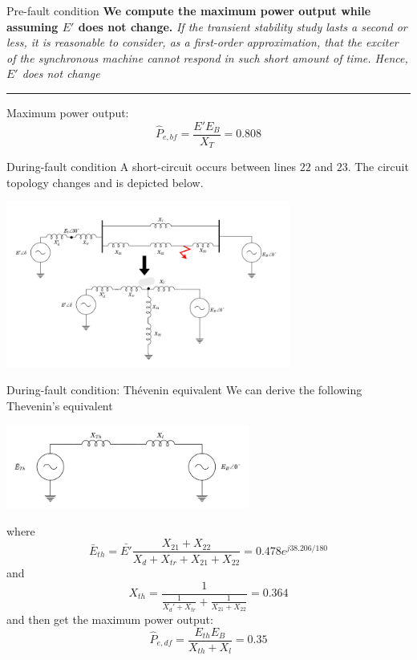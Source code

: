 \begin{frame}{Pre-fault condition}
\textbf{We compute the maximum power output while assuming $E'$ does not change.}
\emph{If the transient stability study lasts a second or less, it is reasonable to consider, as a first-order approximation, that the exciter of the synchronous machine cannot respond in such short amount of time. Hence, $E'$ does not change}
\vspace{0.5cm}
\hrule
\vspace{0.5cm}
Maximum power output:
$$\hat{P}_{e,bf} = \frac{E'E_{B}}{X_{T}} = 0.808$$
\end{frame}

\begin{frame}[allowframebreaks]{During-fault condition}
A short-circuit occurs between lines $22$ and $23$. The circuit topology changes and is depicted below.
\begin{center}
\includegraphics[width=0.7\textwidth]{images/DuringFault.png}
\end{center}
\end{frame}

\begin{frame}[allowframebreaks]{During-fault condition: Thévenin equivalent}
We can derive the following Thevenin's equivalent
\begin{center}
\includegraphics[width=0.6\textwidth]{images/TheveninEquiv.png}
\end{center}
where
$$\bar{E}_{th} = \bar{E'} \frac{X_{21} + X_{22}}{X_{d}+X_{tr} + X_{21} + X_{22}} = 0.478 e^{j 38.206/180}$$
and
$$X_{th} = \frac{1}{\frac{1}{X_d' + X_{tr}}+\frac{1}{X_{21}+X_{22}}} = 0.364$$
and then get the maximum power output:
$$\hat{P}_{e,df} = \frac{E_{th}E_{B}}{X_{th} + X_{l}} = 0.35$$
\end{frame}

